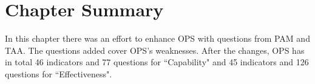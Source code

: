 

\section{Chapter Summary}
In this chapter there was an effort to enhance \ac{OPS} with questions from \ac{PAM} and \ac{TAA}. The questions added cover \ac{OPS}'s weaknesses. After the changes, \ac{OPS} has in total 46 indicators and 77 questions for ``Capability" and 45 indicators and 126 questions for ``Effectiveness".











